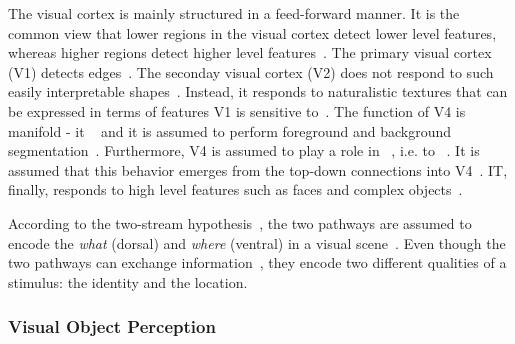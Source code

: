 The visual cortex is mainly structured in a feed-forward manner.
It is the common view that lower regions in the visual cortex detect lower level features, whereas higher regions detect higher level features~\citep{eickenberg2017seeing}.
The primary visual cortex (\ac{V1}) detects edges~\citep{hubel1962receptive, eickenberg2017seeing}.
The seconday visual cortex (\ac{V2}) does not respond to such easily interpretable shapes~\citep{freeman2013functional}.
Instead, it responds to naturalistic textures that can be expressed in terms of features \ac{V1} is sensitive to~\citep{freeman2013functional}.
The function of V4 is manifold - it ~\citep{eickenberg2017seeing} and it is assumed to perform foreground and background segmentation~\citep{roe2012toward}.
Furthermore, \ac{V4} is assumed to play a role in ~\citep{roe2012toward}, i.e. to ~\citep{roe2012toward}.
It is assumed that this behavior emerges from the top-down connections into \ac{V4}~\citep{roe2012toward}.
\ac{IT}, finally, responds to high level features such as faces and complex objects~\citep{logothetis1995shape, eickenberg2017seeing}.

According to the two-stream hypothesis~\citep{goodale1992separate}, the two pathways are assumed to encode the \textit{what} (dorsal) and \textit{where} (ventral) in a visual scene~\citep[p. 520]{mack2013principles}.
Even though the two pathways can exchange information~\citep[p. 564]{mack2013principles}, they encode two different qualities of a stimulus: the identity and the location.

\subsubsection{Visual Object Perception}\label{subsec:visual-object-perception}

